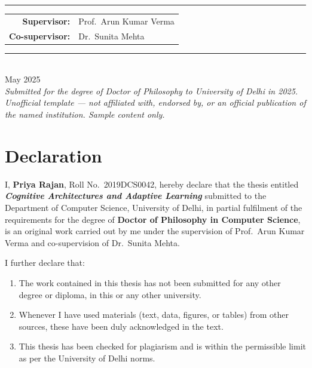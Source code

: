 \documentclass[12pt, a4paper, oneside]{report}
\theoremstyle{definition}
\theoremstyle{remark}
\newcommand{\thesisshorttitle}{Cognitive Architectures and Adaptive Learning}
\newcommand{\thesisauthor}{Priya Rajan}
\newcommand{\thesisrollno}{2019DCS0042}
\newcommand{\thesissupervisor}{Prof.\ Arun Kumar Verma}
\newcommand{\thesiscosupervisor}{Dr.\ Sunita Mehta}
\newcommand{\thesisdept}{Department of Computer Science}
\newcommand{\thesisuniversity}{University of Delhi}
\newcommand{\thesisyear}{2025}
\newcommand{\thesisdegree}{Doctor of Philosophy}
\newcommand{\submissionmonth}{May \thesisyear}
\begin{document}
\begin{titlepage}
\begin{center}
\vspace{0.6cm}
{\color{dupurple}\rule{0.6\linewidth}{0.4pt}}
\vspace{0.4cm}

\begin{tabular}{@{}rl@{}}
  {\small\bfseries\color{dupurple}Supervisor:} & {\small\thesissupervisor} \\[4pt]
  {\small\bfseries\color{dupurple}Co-supervisor:} & {\small\thesiscosupervisor}
\end{tabular}

\vfill

{\color{dupurple}\rule{\linewidth}{0.4pt}}\\[4pt]
{\normalsize\submissionmonth}\\[2pt]
{\small\itshape\color{neutralgrey}
  Submitted for the degree of \thesisdegree{} to \thesisuniversity{} in \thesisyear.}
\vfill
{\footnotesize\itshape Unofficial template --- not affiliated with, endorsed by, or an official publication of the named institution. Sample content only.}
\end{center}
\end{titlepage}

\chapter*{Declaration}
\thispagestyle{plain}

I, \textbf{\thesisauthor}, Roll No.\ \thesisrollno, hereby declare that the thesis entitled
\textbf{\textit{\thesisshorttitle}} submitted to the \thesisdept, \thesisuniversity, in
partial fulfilment of the requirements for the degree of \textbf{\thesisdegree{} in Computer
Science}, is an original work carried out by me under the supervision of \thesissupervisor{}
and co-supervision of \thesiscosupervisor.

\medskip
I further declare that:
\begin{enumerate}[label=(\alph*)]
  \item The work contained in this thesis has not been submitted for any other degree or
        diploma, in this or any other university.
  \item Whenever I have used materials (text, data, figures, or tables) from other sources,
        these have been duly acknowledged in the text.
  \item This thesis has been checked for plagiarism and is within the permissible limit as per
        the University of Delhi norms.
\end{enumerate}
\end{document}
